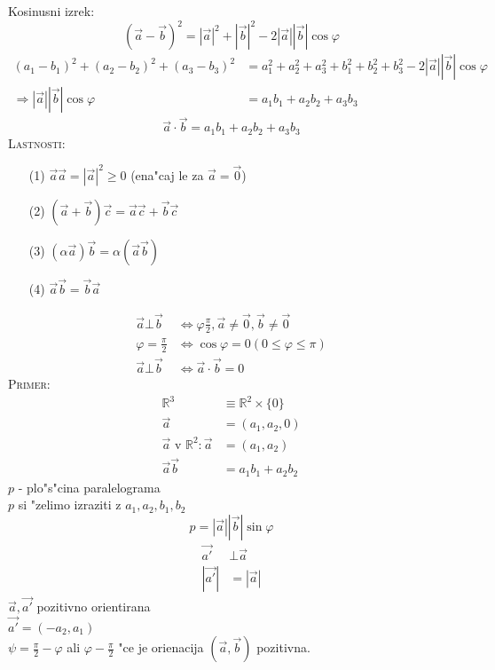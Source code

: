Kosinusni izrek:
\[(\vec{a} - \vec{b})^2 = |\vec{a}|^2 + |\vec{b}|^2 - 2|\vec{a}||\vec{b}|\cos\varphi\]
\begin{align*}
	(a_1 - b_1)^2 + (a_2 - b_2)^2 + (a_3 - b_3)^2 &= a_1^2 + a_2^2 + a_3^2 + b_1^2 + b_2^2 + b_3^2 - 2|\vec{a}||\vec{b}|\cos\varphi\\
	\Rightarrow |\vec{a}||\vec{b}|\cos\varphi &= a_1b_1 + a_2b_2 + a_3b_3
\end{align*}
\[\vec{a} \cdot \vec{b} = a_1b_1 + a_2b_2 + a_3b_3\]
\textsc{Lastnosti:}
\begin{enumerate}
	\item[(1)] \(\vec{a} \vec{a} = |\vec{a}|^2 \geq 0\) (ena"caj le za \(\vec{a} = \vec{0}\))
	\item[(2)] \((\vec{a} + \vec{b})\vec{c} = \vec{a}\vec{c} + \vec{b}\vec{c}\)
	\item[(3)] \((\alpha\vec{a})\vec{b} = \alpha(\vec{a}\vec{b})\)
	\item[(4)] \(\vec{a}\vec{b} = \vec{b}\vec{a}\)
\end{enumerate}
\begin{align*}
	\vec{a} \bot \vec{b} &\Leftrightarrow \varphi \frac{\pi}{2}, \vec{a} \neq \vec{0}, \vec{b} \neq \vec{0}\\
	\varphi = \frac{\pi}{2} &\Leftrightarrow \cos\varphi = 0 (0 \leq \varphi \leq \pi)\\
	\vec{a} \bot \vec{b} &\Leftrightarrow \vec{a} \cdot \vec{b} = 0
\end{align*}
\textsc{Primer:}
\begin{align*}
	\mathbb{R}^3 &\equiv \mathbb{R}^2 \times \{0\}\\
	\vec{a} &= (a_1, a_2, 0)\\
	\vec{a} \text{ v } \mathbb{R}^2: \vec{a} &= (a_1, a_2)\\
	\vec{a} \vec{b} &= a_1b_1 + a_2b_2
\end{align*}
\(p\) - plo"s"cina paralelograma\\
\(p\) si "zelimo izraziti z \(a_1, a_2, b_1, b_2\)
\[p = |\vec{a}||\vec{b}|\sin\varphi\]
\begin{align*}
	\vec{a'} &\bot \vec{a}\\
	|\vec{a'}| &= |\vec{a}|
\end{align*}
\(\vec{a}, \vec{a'}\) pozitivno orientirana\\
\(\vec{a'} = (-a_2, a_1)\)\\
\(\psi = \frac{\pi}{2} - \varphi\) ali \(\varphi - \frac{\pi}{2}\) "ce je orienacija \((\vec{a}, \vec{b})\) pozitivna.

